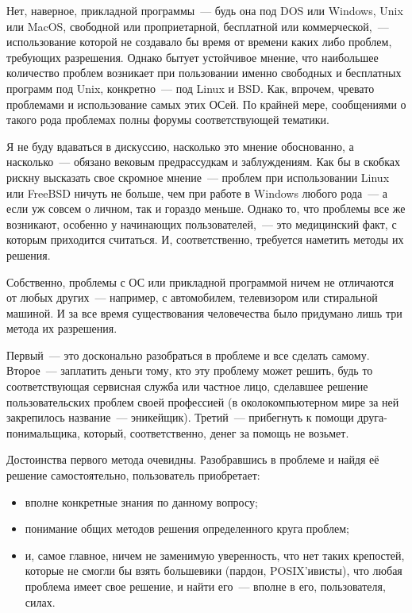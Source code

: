 Нет, наверное, прикладной программы~--- будь она под DOS или Windows, Unix или MacOS, свободной или проприетарной, бесплатной или коммерческой,~--- использование которой не создавало бы время от времени каких либо проблем, требующих разрешения. Однако бытует устойчивое мнение, что наибольшее количество проблем возникает при пользовании именно свободных и бесплатных программ под Unix, конкретно~--- под Linux и BSD. Как, впрочем, чревато проблемами и использование самых этих ОСей. По крайней мере, сообщениями о такого рода проблемах полны форумы соответствующей тематики.

Я не буду вдаваться в дискуссию, насколько это мнение обоснованно, а насколько~--- обязано вековым предрассудкам и заблуждениям. Как бы в скобках рискну высказать свое скромное мнение~--- проблем при использовании Linux или FreeBSD ничуть не больше, чем при работе в Windows любого рода~--- а если уж совсем о личном, так и гораздо меньше. Однако то, что проблемы все же возникают, особенно у начинающих пользователей,~--- это медицинский факт, с которым приходится считаться. И, соответственно, требуется наметить методы их решения.

Собственно, проблемы с ОС или прикладной программой ничем не отличаются от любых других~--- например, с автомобилем, телевизором или стиральной машиной. И за все время существования человечества было придумано лишь три метода их разрешения.

Первый~--- это досконально разобраться в проблеме и все сделать самому. Второе~--- заплатить деньги тому, кто эту проблему может решить, будь то соответствующая сервисная служба или частное лицо, сделавшее решение пользовательских проблем своей профессией (в околокомпьютерном мире за ней закрепилось название~--- эникейщик). Третий~--- прибегнуть к помощи друга-понимальщика, который, соответственно, денег за помощь не возьмет.

Достоинства первого метода очевидны. Разобравшись в проблеме и найдя её решение самостоятельно, пользователь приобретает:

\begin{itemize}
	\item вполне конкретные знания по данному вопросу; 
	\item понимание общих методов решения определенного круга проблем; 
	\item и, самое главное, ничем не заменимую уверенность, что нет таких крепостей, которые не смогли бы взять большевики (пардон, POSIX'ивисты), что любая проблема имеет свое решение, и найти его~--- вполне в его, пользователя, силах. 
\end{itemize}


